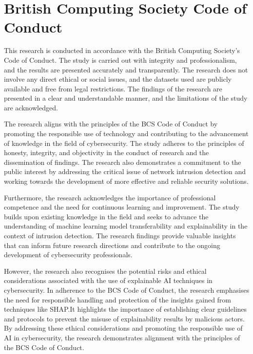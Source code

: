 \section{British Computing Society Code of Conduct}
This research is conducted in accordance with the British Computing Society's Code of Conduct. The study is carried out with integrity and professionalism, and the results are presented accurately and transparently. The research does not involve any direct ethical or social issues, and the datasets used are publicly available and free from legal restrictions. The findings of the research are presented in a clear and understandable manner, and the limitations of the study are acknowledged.

The research aligns with the principles of the BCS Code of Conduct by promoting the responsible use of technology and contributing to the advancement of knowledge in the field of cybersecurity. The study adheres to the principles of honesty, integrity, and objectivity in the conduct of research and the dissemination of findings. The research also demonstrates a commitment to the public interest by addressing the critical issue of network intrusion detection and working towards the development of more effective and reliable security solutions.

Furthermore, the research acknowledges the importance of professional competence and the need for continuous learning and improvement. The study builds upon existing knowledge in the field and seeks to advance the understanding of machine learning model transferability and explainability in the context of intrusion detection. The research findings provide valuable insights that can inform future research directions and contribute to the ongoing development of cybersecurity professionals.

However, the research also recognises the potential risks and ethical considerations associated with the use of explainable AI techniques in cybersecurity. In adherence to the BCS Code of Conduct, the research emphasises the need for responsible handling and protection of the insights gained from techniques like SHAP.\@ It highlights the importance of establishing clear guidelines and protocols to prevent the misuse of explainability results by malicious actors. By addressing these ethical considerations and promoting the responsible use of AI in cybersecurity, the research demonstrates alignment with the principles of the BCS Code of Conduct.